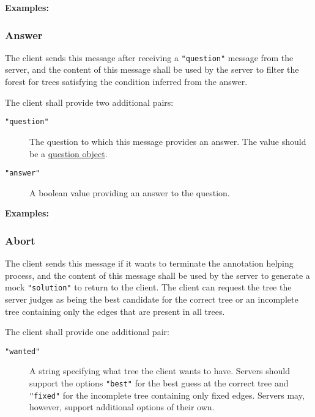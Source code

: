 \documentclass{scrartcl}
\newcommand{\jsstring}[1]{\texttt{\color{OrangeRed}"#1"}}
\newcommand{\Examples}{\noindent\textbf{Examples:}}
\begin{document}
\Examples





\subsubsection{Answer}
\label{ssub:Answer}

The client sends this message after receiving a \jsstring{question} message from the server,
and the content of this message shall be used by the server to filter the forest for trees satisfying
the condition inferred from the answer.

The client shall provide two additional pairs:
\begin{description}
    \item[\jsstring{question}] The question to which this message provides an answer.
        The value should be a \hyperref[ssub:Question object]{question object}.
    \item[\jsstring{answer}] A boolean value providing an answer to the question.
\end{description}

\Examples



\subsubsection{Abort}
\label{ssub:Abort}

The client sends this message if it wants to terminate the annotation helping process,
and the content of this message shall be used by the server to generate a mock \jsstring{solution} to return to the client.
The client can request the tree the server judges as being the best candidate for the correct tree or an incomplete tree containing only the edges that are present in all trees.

The client shall provide one additional pair:
\begin{description}
    \item[\jsstring{wanted}] A string specifying what tree the client wants to have.
        Servers should support the options \jsstring{best} for the best guess at the correct tree and \jsstring{fixed} for the incomplete tree containing only fixed edges.
        Servers may, however, support additional options of their own.
\end{description}
\end{document}
